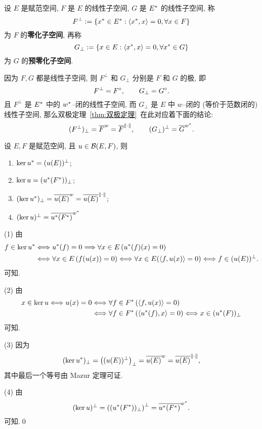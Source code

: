 	\begin{Definition}\label{def:零化子空间}
		设 $ E $ 是赋范空间, $ F $ 是 $ E $ 的线性子空间, $ G $ 是 $ E^{*} $ 的线性子空间, 称
		\[
			F^{\bot}:=\{ x^{*}\in E^{*}:\left\langle x^{*}, x \right\rangle=0, \forall x\in F \}
		\]	
		为 $ F $ 的\textbf{零化子空间}, 再称
		\[
			G_{\bot}:=\{ x\in E:\left\langle x^{*}, x \right\rangle=0, \forall x^{*}\in G \}
		\]
		为 $ G $ 的\textbf{预零化子空间}.
	\end{Definition}

	\begin{Remark}
		因为 $ F, G $ 都是线性子空间, 则 $ F^{\bot} $ 和 $ G_{\bot} $ 分别是 $ F $ 和 $ G $ 的极, 即
		\[
			F^{\bot}=F^{\circ},\qquad G_{\bot}=G^{\circ}.
		\]
		且 $ F^{\bot} $ 是 $ E^{*} $ 中的 $ w^{*} $--闭的线性子空间, 而 $ G_{\bot} $ 是 $ E $ 中 $ w $--闭的 (等价于范数闭的) 线性子空间, 那么双极定理~\ref{thm:双极定理}~在此对应着下面的结论:
		\[
			(F^{\bot})_{\bot}=\overline{F}^{w}=\overline{F}^{\left\| \cdot \right\|}, \qquad (G_{\bot})^{\bot}=\overline{G}^{w^{*}}.
		\]
	\end{Remark}

	\begin{Theorem}
		设 $ E, F $ 是赋范空间, 且 $ u\in\mathcal{B}(E, F) $, 则
		\begin{enumerate}[(1)]
			\item $ \ker u^{*}=(u(E))^{\bot} $;
			\item $ \ker u=(u^{*}(F^{*}))_{\bot} $;
			\item $ (\ker u^{*})_{\bot}=\overline{u(E)}^{w}=\overline{u(E)}^{\left\| \cdot \right\|} $;
			\item $ (\ker u)^{\bot}=\overline{u^{*}(F^{*})}^{w^{*}} $
		\end{enumerate}
	\end{Theorem}
	\begin{Proof}
		(1) 由
		\[
			\begin{aligned}
				f\in\ker u^{*} & \Longleftrightarrow u^{*}(f)=0 \Longrightarrow \forall x\in E\,(u^{*}(f)(x)=0)\\
				& \Longleftrightarrow \forall x\in E\,(f(u(x))=0) \Longleftrightarrow \forall x\in E(\left\langle f, u(x) \right\rangle=0)\Longleftrightarrow f\in(u(E))^{\bot}.
			\end{aligned}
		\]
		可知.

		(2) 由
		\[
			\begin{aligned}
				x\in\ker u\Longleftrightarrow u(x)=0 &  \Longleftrightarrow \forall f\in F^{*}\,(\left\langle f, u(x) \right\rangle=0)\\
				& \Longleftrightarrow \forall f\in F^{*}\,(\left\langle u^{*}(f), x \right\rangle=0)\Longleftrightarrow x\in(u^{*}(F))_{\bot}
			\end{aligned}
		\]
		可知.

		(3) 因为
		\[
			(\ker u^{*})_{\bot}=\left( (u(E))^{\bot} \right)_{\bot}=\overline{u(E)}^{w}=\overline{u(E)}^{\left\| \cdot \right\|},
		\]
		其中最后一个等号由 Mazur 定理可证.

		(4) 由
		\[
			(\ker u)^{\bot}=\left( (u^{*}(F^{*}))_{\bot} \right)^{\bot}=\overline{u^{*}(F^{*})}^{w^{*}}.
		\]
		可知.\qed
	\end{Proof}

